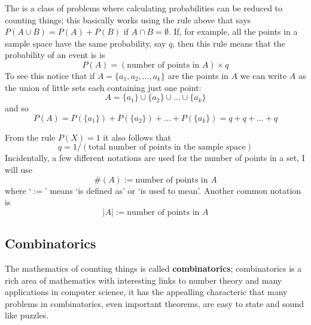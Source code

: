 \documentclass[11pt,a4paper]{scrartcl}
\begin{document}
The is a class of problems where calculating probabilities can be
reduced to counting things; this basically works using the rule above
that says $P(A\cup B)=P(A)+P(B)$ if $A\cap B=\emptyset$. If, for
example, all the points in a sample space have the same probability, say $q$, then
this rule means that the probability of an event is is 
\begin{equation}
P(A)=(\mbox{number of points in }A)\times q
\end{equation}
To see this notice that if $A=\{a_1,a_2,\ldots,a_k\}$ are the points in $A$ we can write $A$ as the union of little sets each containing just one point:
\begin{equation}
A=\{a_1\}\cup\{a_2\}\cup\ldots\cup\{a_k\}
\end{equation}
and so
\begin{equation}
P(A)=P(\{a_1\})+P(\{a_2\})+\ldots+P(\{a_k\})=q+q+\ldots+q
\end{equation}

From the rule $P(X)=1$ it also follows that 
\begin{equation}
q=1/(\mbox{total number of points in the sample space})
\end{equation}
Incidentally, a few different notations are used for the number of points in a set, I will use
\begin{equation}
\#(A):=\mbox{number of points in }A
\end{equation}
where \lq{}$:=$\rq{} means \lq{}is defined as\rq{} or \lq{}is used to
mean\rq{}. Another common notation is
\begin{equation}
|A|:=\mbox{number of points in }A
\end{equation}

\subsection*{Combinatorics}

The mathematics of counting things is called \textbf{combinatorics};
combinatorics is a rich area of mathematics with interesting links to
number theory and many applications in computer science, it has the
appealling characteric that many problems in combinatorics, even
important theorems, are easy to state and sound like puzzles.
\end{document}
